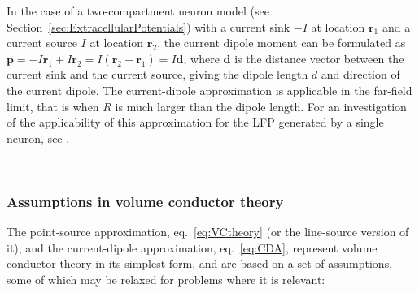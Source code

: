\documentclass[preprint,11pt,authoryear]{elsarticle}
\newcommand{\hlR}[2][red]{ {\sethlcolor{#1} \hl{#2}} }
\newcommand{\hlp}[2][Purple]{ {\sethlcolor{#1} \hl{#2}} }
\newcommand{\gen}[1]{\color{white}{\hlR{GTE: #1 }}\color{black}}
\newcommand{\snnote}[1]{\color{white}{\hlp{SN: #1 }}\color{black}}
\begin{document}
In the case of a two-compartment neuron model (see Section~\ref{sec:ExtracellularPotentials}) with a current sink $-I$ at location $\mathbf{r}_1$ and a current source $I$ at location $\mathbf{r}_2$, the current dipole moment can be formulated as $\mathbf{p} = -I\mathbf{r}_1 + I\mathbf{r}_2 = I(\mathbf{r}_2 - \mathbf{r}_1) = I\mathbf{d}$, where $\mathbf{d}$ is the distance vector between the current sink and the current source, giving the dipole length $d$ and direction of the current dipole. The current-dipole approximation is applicable in the far-field limit, that is when $R$ is much larger than the dipole length. For an investigation of the applicability of this approximation for the LFP generated by a single neuron, 
see \cite{Linden2010}.

\


\subsubsection{Assumptions in volume conductor theory}
\label{sec:VC_assumptions}
The point-source approximation, eq.~\ref{eq:VCtheory} (or the line-source version of it), and the current-dipole approximation, eq.~\eqref{eq:CDA}, represent volume conductor theory in its simplest form, and are based on a set of assumptions, some of which may be relaxed for problems where it is relevant: 
\end{document}
